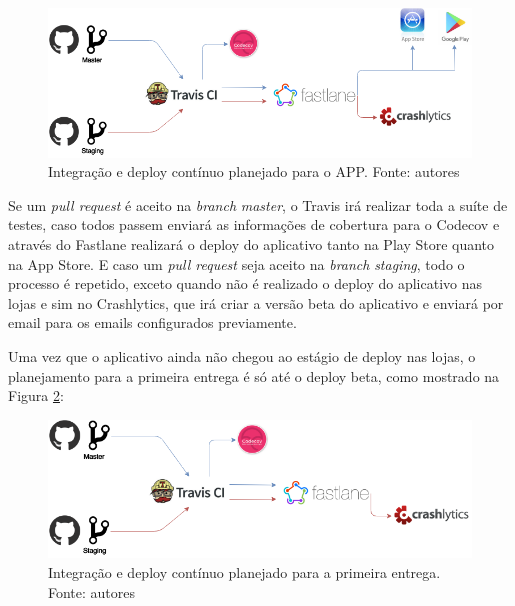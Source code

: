\begin{figure}[H]
    \centering
    \includegraphics[scale=0.5]{figuras/ci_should_be.png}
    \caption[Integração e deploy contínuo planejado para o APP]{Integração e deploy contínuo planejado para o APP. Fonte: autores}
    \label{img:integracao_deploy_continuo_planejado_app}
\end{figure}

Se um \textit{pull request} é aceito na \textit{branch} \textit{master}, o Travis irá realizar toda a suíte de testes, caso todos passem enviará as informações de cobertura para o
Codecov e através do Fastlane realizará o deploy do aplicativo tanto na Play Store quanto na App Store. E caso um \textit{pull request} seja aceito na \textit{branch} \textit{staging}, todo o processo é repetido, exceto quando não é realizado o deploy do aplicativo nas lojas e sim no Crashlytics, que irá criar a versão beta do aplicativo e enviará por email para os emails configurados previamente.

Uma vez que o aplicativo ainda não chegou ao estágio de deploy nas lojas, o planejamento para a primeira entrega é só até o deploy beta, como mostrado na Figura \ref{img:integracao_deploy_continuo_planejado_primeira_entrega}:

\begin{figure}[H]
    \centering
    \includegraphics[scale=0.5]{figuras/ci_as_is.png}
    \caption[Integração e deploy contínuo planejado para a primeira entrega]{Integração e deploy contínuo planejado para a primeira entrega. Fonte: autores}
    \label{img:integracao_deploy_continuo_planejado_primeira_entrega}
\end{figure}

